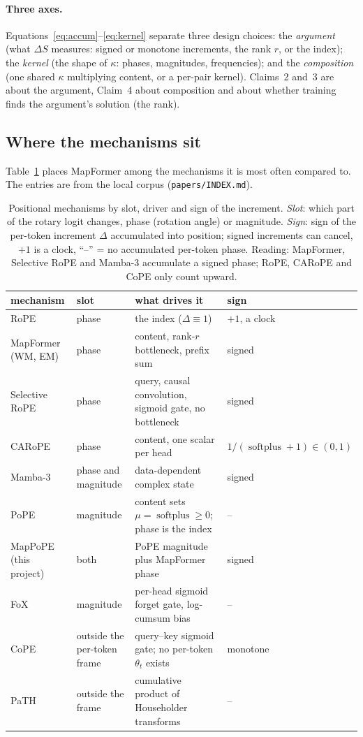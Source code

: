 \documentclass[10pt]{article}
\DeclareMathOperator{\softplus}{softplus}
\begin{document}
\paragraph{Three axes.} Equations~\eqref{eq:accum}--\eqref{eq:kernel} separate three design choices:
the \emph{argument} (what $\Delta S$ measures: signed or monotone increments, the rank $r$, or the
index); the \emph{kernel} (the shape of $\kappa$: phases, magnitudes, frequencies); and the
\emph{composition} (one shared $\kappa$ multiplying content, or a per-pair kernel). Claims~2 and~3
are about the argument, Claim~4 about composition and about whether training finds the argument's
solution (the rank).

\subsection{Where the mechanisms sit}

Table~\ref{tab:landscape} places MapFormer among the mechanisms it is most often compared to. The
entries are from the local corpus (\texttt{papers/INDEX.md}).

\begin{table}[t]
\centering
\small
\captionsetup{font=footnotesize,skip=4pt}
\caption{Positional mechanisms by slot, driver and sign of the increment. \emph{Slot}: which part of the rotary logit changes, phase (rotation angle) or magnitude. \emph{Sign}: sign of the per-token increment $\Delta$ accumulated into position; signed increments can cancel, $+1$ is a clock, ``--'' = no accumulated per-token phase. Reading: MapFormer, Selective RoPE and Mamba-3 accumulate a signed phase; RoPE, CARoPE and CoPE only count upward.}
\label{tab:landscape}
\begin{tabular}{@{}p{3.2cm}p{2.4cm}p{6.1cm}p{2.7cm}@{}}
\toprule
mechanism & slot & what drives it & sign \\
\midrule
RoPE & phase & the index ($\Delta\equiv1$) & $+1$, a clock \\
MapFormer (WM, EM) & phase & content, rank-$r$ bottleneck, prefix sum & signed \\
Selective RoPE & phase & query, causal convolution, sigmoid gate, no bottleneck & signed \\
CARoPE \citep{veisi2025carope} & phase & content, one scalar per head & $1/(\softplus+1)\in(0,1)$ \\
Mamba-3 & phase and magnitude & data-dependent complex state & signed \\
PoPE \citep{gopalakrishnan2025pope} & magnitude & content sets $\mu=\softplus\ge0$; phase is the index & -- \\
MapPoPE (this project) & both & PoPE magnitude plus MapFormer phase & signed \\
FoX \citep{lin2025fox} & magnitude & per-head sigmoid forget gate, log-cumsum bias & -- \\
CoPE & outside the per-token frame & query--key sigmoid gate; no per-token $\theta_t$ exists & monotone \\
PaTH \citep{yang2025path} & outside the frame & cumulative product of Householder transforms & -- \\
\bottomrule
\end{tabular}
\end{table}
\end{document}
